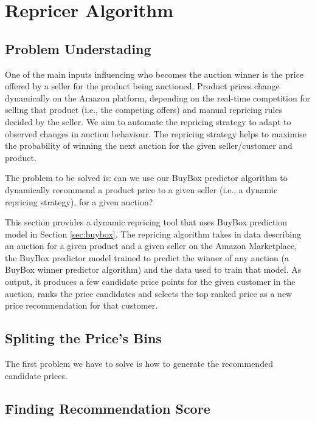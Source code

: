 \section{Repricer Algorithm}
\label{sec:repricer}

\subsection{Problem Understading}
\label{sec:rpproblem}

One of the main inputs influencing who becomes the auction winner is the price offered by a seller for the product being auctioned. Product prices change dynamically on the Amazon platform, depending on the real-time competition for selling that product (i.e., the competing offers) and manual repricing rules decided by the seller. We aim to automate the repricing strategy to adapt to observed changes in auction behaviour. The repricing strategy helps to maximise the probability of winning the next auction for the given seller/customer and product. 
 
The problem to be solved is: can we use our BuyBox predictor algorithm to dynamically recommend a product price to a given seller (i.e., a dynamic repricing strategy), for a given auction?

This section provides a dynamic repricing tool that uses BuyBox prediction model in Section \ref{sec:buybox}. The repricing algorithm takes in data describing an auction for a given product and a given seller on the Amazon Marketplace, the BuyBox predictor model trained to predict the winner of any auction (a BuyBox winner predictor algorithm) and the data used to train that model. As output, it produces a few candidate price points for the given customer in the auction, ranks the price candidates and selects the top ranked price as a new price recommendation for that customer.

\subsection{Spliting the Price's Bins}
\label{sec:spliting}

The first problem we have to solve is how to generate the recommended candidate prices.

\subsection{Finding Recommendation Score}
\label{sec:finalscore}

